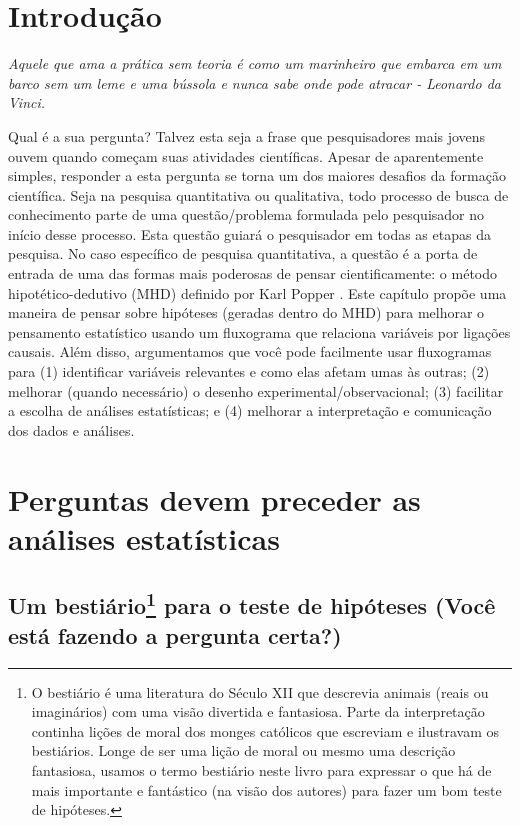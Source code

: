 \documentclass[
]{book}
\renewenvironment{quote}{\begin{VF}}{\end{VF}}
\begin{document}
\hypertarget{introduuxe7uxe3o-1}{%
\section{Introdução}\label{introduuxe7uxe3o-1}}

\begin{quote}
\emph{Aquele que ama a prática sem teoria é como um marinheiro que embarca em um barco sem um leme e uma bússola e nunca sabe onde pode atracar - Leonardo da Vinci.}
\end{quote}

Qual é a sua pergunta? Talvez esta seja a frase que pesquisadores mais jovens ouvem quando começam suas atividades científicas. Apesar de aparentemente simples, responder a esta pergunta se torna um dos maiores desafios da formação científica. Seja na pesquisa quantitativa ou qualitativa, todo processo de busca de conhecimento parte de uma questão/problema formulada pelo pesquisador no início desse processo. Esta questão guiará o pesquisador em todas as etapas da pesquisa. No caso específico de pesquisa quantitativa, a questão é a porta de entrada de uma das formas mais poderosas de pensar cientificamente: o método hipotético-dedutivo (MHD) definido por Karl Popper \citeyearpar{popper_logic_1959}. Este capítulo propõe uma maneira de pensar sobre hipóteses (geradas dentro do MHD) para melhorar o pensamento estatístico usando um fluxograma que relaciona variáveis por ligações causais. Além disso, argumentamos que você pode facilmente usar fluxogramas para (1) identificar variáveis relevantes e como elas afetam umas às outras; (2) melhorar (quando necessário) o desenho experimental/observacional; (3) facilitar a escolha de análises estatísticas; e (4) melhorar a interpretação e comunicação dos dados e análises.

\hypertarget{perguntas-devem-preceder-as-anuxe1lises-estatuxedsticas}{%
\section{Perguntas devem preceder as análises estatísticas}\label{perguntas-devem-preceder-as-anuxe1lises-estatuxedsticas}}

\hypertarget{um-bestiuxe1rio1-para-o-teste-de-hipuxf3teses-vocuxea-estuxe1-fazendo-a-pergunta-certa}{%
\subsection[Um bestiário para o teste de hipóteses (Você está fazendo a pergunta certa?)]{\texorpdfstring{Um bestiário\footnote{O bestiário é uma literatura do Século XII que descrevia animais (reais ou imaginários) com uma visão divertida e fantasiosa. Parte da interpretação continha lições de moral dos monges católicos que escreviam e ilustravam os bestiários. Longe de ser uma lição de moral ou mesmo uma descrição fantasiosa, usamos o termo bestiário neste livro para expressar o que há de mais importante e fantástico (na visão dos autores) para fazer um bom teste de hipóteses.} para o teste de hipóteses (Você está fazendo a pergunta certa?)}{Um bestiário para o teste de hipóteses (Você está fazendo a pergunta certa?)}}\label{um-bestiuxe1rio1-para-o-teste-de-hipuxf3teses-vocuxea-estuxe1-fazendo-a-pergunta-certa}}
\end{document}
